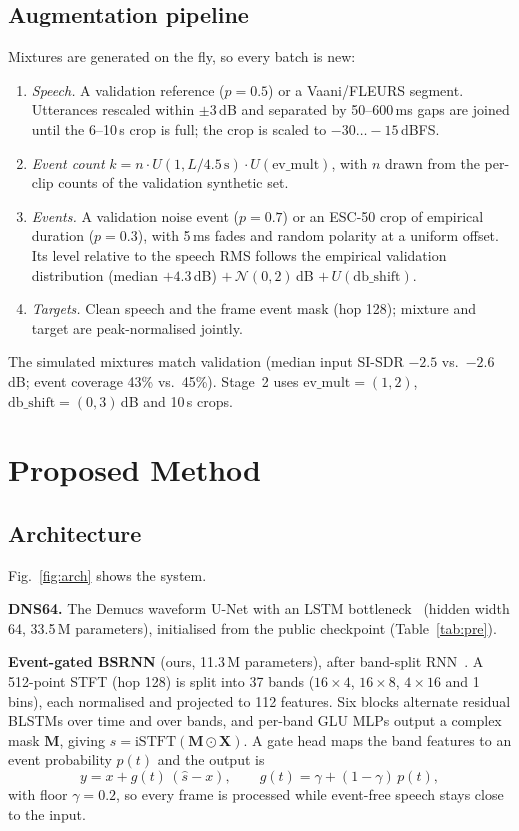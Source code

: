 \documentclass[conference]{IEEEtran}
\begin{document}
\subsection{Augmentation pipeline}
Mixtures are generated on the fly, so every batch is new:
\begin{enumerate}
\item \emph{Speech.} A validation reference ($p{=}0.5$) or a Vaani/FLEURS segment. Utterances rescaled within
$\pm$3\,dB and separated by 50--600\,ms gaps are joined until the 6--10\,s crop is full; the crop is scaled to
$-30\ldots-15$\,dBFS.
\item \emph{Event count} $k=n\cdot U(1,L/4.5\,\text{s})\cdot U(\text{ev\_mult})$, with $n$ drawn from the per-clip
counts of the validation synthetic set.
\item \emph{Events.} A validation noise event ($p{=}0.7$) or an ESC-50 crop of empirical duration ($p{=}0.3$),
with 5\,ms fades and random polarity at a uniform offset. Its level relative to the speech RMS follows the
empirical validation distribution (median $+4.3$\,dB) $+\,\mathcal{N}(0,2)$\,dB $+\,U(\text{db\_shift})$.
\item \emph{Targets.} Clean speech and the frame event mask (hop 128); mixture and target are peak-normalised jointly.
\end{enumerate}
The simulated mixtures match validation (median input SI-SDR $-2.5$ vs.\ $-2.6$\,dB; event coverage 43\% vs.\
45\%). Stage~2 uses $\text{ev\_mult}{=}(1,2)$, $\text{db\_shift}{=}(0,3)$\,dB and 10\,s crops.

\section{Proposed Method}
\subsection{Architecture}
Fig.~\ref{fig:arch} shows the system.

\textbf{DNS64.} The Demucs waveform U-Net with an LSTM bottleneck~\cite{demucs} (hidden width 64, 33.5\,M
parameters), initialised from the public checkpoint (Table~\ref{tab:pre}).

\textbf{Event-gated BSRNN} (ours, 11.3\,M parameters), after band-split RNN~\cite{bsrnn}. A 512-point STFT (hop
128) is split into 37 bands ($16{\times}4$, $16{\times}8$, $4{\times}16$ and 1 bins), each normalised and projected
to 112 features. Six blocks alternate residual BLSTMs over time and over bands, and per-band GLU MLPs output a
complex mask $\mathbf{M}$, giving $\hat{s}=\text{iSTFT}(\mathbf{M}\odot\mathbf{X})$. A gate head maps the band
features to an event probability $p(t)$ and the output is
\begin{equation}
y = x + g(t)\,(\hat{s}-x),\qquad g(t)=\gamma+(1-\gamma)\,p(t),
\end{equation}
with floor $\gamma=0.2$, so every frame is processed while event-free speech stays close to the input.
\end{document}
